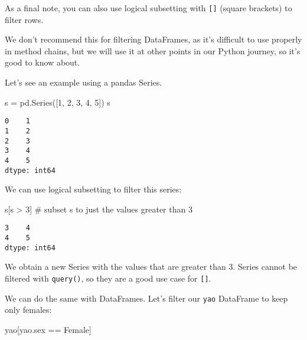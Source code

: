 \documentclass[
  letterpaper,
  DIV=11,
  numbers=noendperiod]{scrreprt}
\newenvironment{Shaded}{\begin{snugshade}}{\end{snugshade}}
\newcommand{\CommentTok}[1]{\textcolor[rgb]{0.37,0.37,0.37}{#1}}
\newcommand{\DecValTok}[1]{\textcolor[rgb]{0.68,0.00,0.00}{#1}}
\newcommand{\NormalTok}[1]{\textcolor[rgb]{0.00,0.23,0.31}{#1}}
\newcommand{\OperatorTok}[1]{\textcolor[rgb]{0.37,0.37,0.37}{#1}}
\newcommand{\StringTok}[1]{\textcolor[rgb]{0.13,0.47,0.30}{#1}}
\begin{document}
As a final note, you can also use logical subsetting with
\texttt{{[}{]}} (square brackets) to filter rows.

We don't recommend this for filtering DataFrames, as it's difficult to
use properly in method chains, but we will use it at other points in our
Python journey, so it's good to know about.

Let's see an example using a pandas Series.

\begin{Shaded}
\begin{Highlighting}[]
\NormalTok{s }\OperatorTok{=}\NormalTok{ pd.Series([}\DecValTok{1}\NormalTok{, }\DecValTok{2}\NormalTok{, }\DecValTok{3}\NormalTok{, }\DecValTok{4}\NormalTok{, }\DecValTok{5}\NormalTok{])}
\NormalTok{s}
\end{Highlighting}
\end{Shaded}

\begin{verbatim}
0    1
1    2
2    3
3    4
4    5
dtype: int64
\end{verbatim}

We can use logical subsetting to filter this series:

\begin{Shaded}
\begin{Highlighting}[]
\NormalTok{s[s }\OperatorTok{\textgreater{}} \DecValTok{3}\NormalTok{]  }\CommentTok{\# subset s to just the values greater than 3}
\end{Highlighting}
\end{Shaded}

\begin{verbatim}
3    4
4    5
dtype: int64
\end{verbatim}

We obtain a new Series with the values that are greater than 3. Series
cannot be filtered with \texttt{query()}, so they are a good use case
for \texttt{{[}{]}}.

We can do the same with DataFrames. Let's filter our \texttt{yao}
DataFrame to keep only females:

\begin{Shaded}
\begin{Highlighting}[]
\NormalTok{yao[yao.sex }\OperatorTok{==} \StringTok{\textquotesingle{}Female\textquotesingle{}}\NormalTok{]}
\end{Highlighting}
\end{Shaded}
\end{document}

